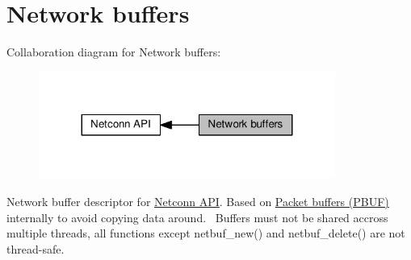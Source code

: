 \hypertarget{group__netbuf}{}\section{Network buffers}
\label{group__netbuf}
Collaboration diagram for Network buffers\+:
\nopagebreak
\begin{figure}[H]
\begin{center}
\leavevmode
\includegraphics[width=275pt]{group__netbuf}
\end{center}
\end{figure}
Network buffer descriptor for \hyperlink{group__netconn}{Netconn A\+PI}. Based on \hyperlink{group__pbuf}{Packet buffers (P\+B\+UF)} internally to avoid copying data around.~\newline
Buffers must not be shared accross multiple threads, all functions except netbuf\+\_\+new() and netbuf\+\_\+delete() are not thread-\/safe. 
